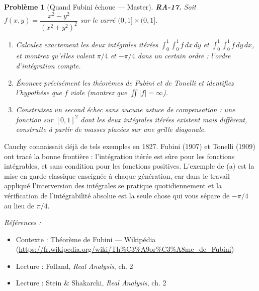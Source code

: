\documentclass[11pt]{article}
\newtheorem{problem}{Problème}
\newenvironment{refs}{\par\small\noindent\emph{Références :}\begin{itemize}\setlength\itemsep{0pt}}{\end{itemize}\normalsize}
\begin{document}
\begin{problem}[{Quand Fubini échoue --- Master}]
\textbf{RA-17.} Soit
$ f(x, y) = \dfrac{x^2 - y^2}{(x^2 + y^2)^2} $ sur le carré $ (0, 1] \times (0, 1] $.
\begin{enumerate}
\item[(a)] Calculez exactement les deux intégrales itérées
$ \int_0^1 \!\! \int_0^1 f \,dx\,dy $ et $ \int_0^1 \!\! \int_0^1 f \,dy\,dx $,
et montrez qu'elles valent $ \pi/4 $ et $ -\pi/4 $ dans un certain ordre : l'ordre
d'intégration compte.
\item[(b)] Énoncez précisément les théorèmes de Fubini et de Tonelli et identifiez l'hypothèse que
$ f $ viole (montrez que $ \iint |f| = \infty $).
\item[(c)] Construisez un second échec sans aucune
astuce de compensation : une fonction sur $ [0,1]^2 $ dont les deux intégrales itérées existent
mais diffèrent, construite à partir de masses placées sur une grille diagonale.
\end{enumerate}

\end{problem}

\noindent Cauchy connaissait déjà de tels exemples en 1827. Fubini (1907) et Tonelli (1909)
ont tracé la bonne frontière : l'intégration itérée est sûre pour les fonctions intégrables, et sans
condition pour les fonctions positives. L'exemple de (a) est la mise en garde classique enseignée à
chaque génération, car dans le travail appliqué l'interversion des intégrales se pratique
quotidiennement et la vérification de l'intégrabilité absolue est la seule chose qui vous sépare de
$ -\pi/4 $ au lieu de $ \pi/4 $.

\begin{refs}
\item Contexte : Théorème de Fubini --- Wikipédia (\url{https://fr.wikipedia.org/wiki/Th%C3%A9or%C3%A8me_de_Fubini})
\item Lecture : Folland, \textit{Real Analysis}, ch. 2
\item Lecture : Stein \& Shakarchi, \textit{Real Analysis}, ch. 2
\end{refs}

\bigskip
\end{document}

